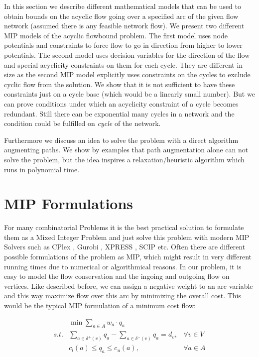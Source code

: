 In this section we describe different mathematical models that can be used to obtain bounds on the acyclic flow going 
over a specified arc of the given flow network (assumed there is any feasible network flow). We present two different 
MIP models of the acyclic flowbound problem. The first model uses node potentials and constraints to force flow to 
go in direction from higher to lower potentials. The second model uses decision variables for the direction of the 
flow and special acyclicity constraints on them for each cycle. They are different in size as the second MIP model 
explicitly uses constraints on the cycles to exclude cyclic flow from the solution. We show that it is not sufficient 
to have these constraints just on a cycle base (which would be a linearly small number). But we can prove 
conditions under which an acyclicity constraint of a cycle becomes redundant. Still there can be exponential many 
cycles in a network and the condition could be fulfilled on \textit{cycle} of the network. 

Furthermore we discuss an idea to solve the problem with a direct algorithm augmenting paths. We show by examples that 
path augmentation alone can not solve the problem, but the idea inspires a relaxation/heuristic algorithm which runs in 
polynomial time.


\section{MIP Formulations}
For many combinatorial Problems it is the best practical solution to formulate them as a Mixed Integer Problem and just 
solve this problem with modern MIP Solvers such as CPlex \cite{cplex}, Gurobi \cite{gurobi}, XPRESS \cite{xpress}, SCIP 
\cite{scip} etc. Often there are different possible 
formulations of the problem as MIP, which might result in very different running times due to numerical or algorithmical 
reasons. In our problem, it is easy to model the flow conservation and the ingoing and outgoing flow on vertices. Like 
described before, we can assign a negative weight to an arc variable and this way maximize flow over this arc by 
minimizing the overall cost. This would be the typical MIP formulation of a minimum cost flow:

\begin{align*}
  &\min \sum_{a\in A} w_a\cdot q_a  \\
 s.t. & \sum_{a\in \delta^+(v)}q_a - \sum_{a\in\delta^- (v)}q_a = d_v, &\forall v\in V \\
  & c_l(a)\le q_a \le c_u(a), & \forall a\in A
\end{align*}

